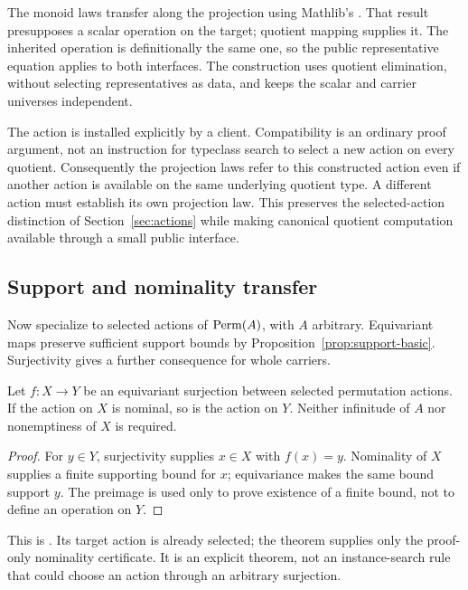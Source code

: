 The monoid laws transfer along the projection using Mathlib's
.
That result presupposes a scalar operation on the
target; quotient mapping supplies it. The inherited operation is
definitionally the same one, so the public representative equation
 applies to both interfaces. The construction
uses quotient elimination, without selecting representatives as data, and
keeps the scalar and carrier universes independent.

The action is installed explicitly by a client. Compatibility is an ordinary
proof argument, not an instruction for typeclass search to select a new
action on every quotient. Consequently the projection laws refer to this
constructed action even if another action is available on the same
underlying quotient type. A different action must establish its own
projection law. This preserves the selected-action distinction of
Section~\ref{sec:actions} while making canonical quotient computation
available through a small public interface.

\subsection{Support and nominality transfer}

Now specialize to selected actions of $\operatorname{Perm}(A)$, with $A$ arbitrary.
Equivariant maps preserve sufficient support bounds by
Proposition~\ref{prop:support-basic}. Surjectivity gives a further consequence
for whole carriers.

\begin{proposition}
\label{prop:surjective-nominality}
Let $f:X\to Y$ be an equivariant surjection between selected permutation
actions. If the action on $X$ is nominal, so is the action on $Y$.
Neither infinitude of $A$ nor nonemptiness of $X$ is required.
\end{proposition}

\begin{proof}
For $y\in Y$, surjectivity supplies $x\in X$ with $f(x)=y$.
Nominality of $X$ supplies a finite supporting bound for $x$; equivariance
makes the same bound support $y$. The preimage is used only to prove
existence of a finite bound, not to define an operation on $Y$.
\end{proof}

This is . Its target action is
already selected; the theorem supplies only the proof-only nominality
certificate. It is an explicit theorem, not an instance-search rule that
could choose an action through an arbitrary surjection.

